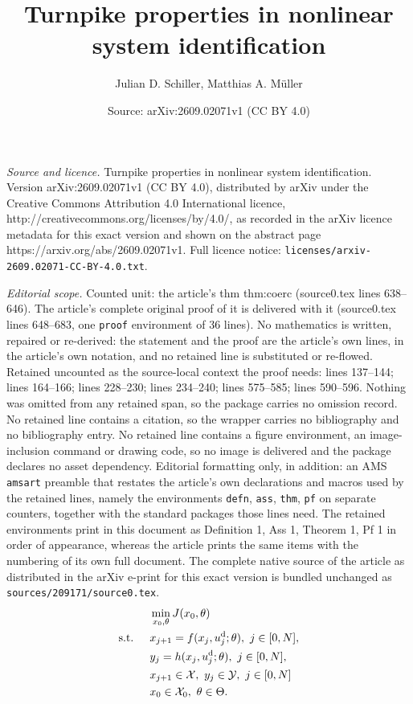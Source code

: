 \documentclass[10pt,a4paper]{amsart}
\title{Turnpike properties in nonlinear system identification}
\author{Julian D. Schiller, Matthias A. M\"uller}
\date{Source: arXiv:2609.02071v1 (CC BY 4.0)}
\begin{document}
\maketitle

\noindent\emph{Source and licence.} Turnpike properties in nonlinear system identification. Version arXiv:2609.02071v1 (CC BY 4.0), distributed by arXiv under the Creative Commons Attribution 4.0 International licence, http://creativecommons.org/licenses/by/4.0/, as recorded in the arXiv licence metadata for this exact version and shown on the abstract page https://arxiv.org/abs/2609.02071v1. Full licence notice: \texttt{licenses/arxiv-2609.02071-CC-BY-4.0.txt}.\par\smallskip

\noindent\textit{Editorial scope.} Counted unit: the article's thm thm:coerc (source0.tex lines 638--646). The article's complete original proof of it is delivered with it (source0.tex lines 648--683, one \texttt{proof} environment of 36 lines). No mathematics is written, repaired or re-derived: the statement and the proof are the article's own lines, in the article's own notation, and no retained line is substituted or re-flowed.  Retained uncounted as the source-local context the proof needs: lines 137--144; lines 164--166; lines 228--230; lines 234--240; lines 575--585; lines 590--596.  Nothing was omitted from any retained span, so the package carries no omission record.  No retained line contains a citation, so the wrapper carries no bibliography and no bibliography entry.  No retained line contains a figure environment, an image-inclusion command or drawing code, so no image is delivered and the package declares no asset dependency.  Editorial formatting only, in addition: an AMS \texttt{amsart} preamble that restates the article's own declarations and macros used by the retained lines, namely the environments \texttt{defn}, \texttt{ass}, \texttt{thm}, \texttt{pf} on separate counters, together with the standard packages those lines need.  The retained environments print in this document as Definition 1, Ass 1, Theorem 1, Pf 1 in order of appearance, whereas the article prints the same items with the numbering of its own full document.  The complete native source of the article as distributed in the arXiv e-print for this exact version is bundled unchanged as \texttt{sources/209171/source0.tex}.
	\begin{align}
		&\min\limits_{x_0,\theta} J(x_0,\theta) \label{eq:NLP_min}\\
		\text{s.t. \quad }
		& x_{j+1} = f(x_j,u_j^\mathrm{d};\theta), \ j\in[0,N], \label{eq:NLP_f}\\
		& y_{j} = h(x_{j},u_j^\mathrm{d};\theta), \ j\in[0,N],\label{eq:NLP_h}\\
		& x_{j+1}\in\mathcal{X}, \ y_{j} \in \mathcal{Y},\ j\in[0,N] \label{eq:NLP_X}\\
		& x_0\in\mathcal{X}_0, \ \theta \in \Theta. \label{eq:NLP_Theta}
	\end{align}
\end{document}

